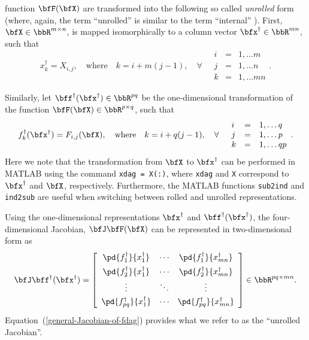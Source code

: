 \documentclass[10pt,pdftex]{article}
\begin{document}
function $\bfF(\bfX)$ are transformed into the following so called 
{\em unrolled} form (where, again, the term ``unrolled'' is similar to
the term ``internal'' \cite{Forth1}).  First, $\bfX\in\bbR^{m\times n}$, is mapped
isomorphically to a column vector $\bfx^\dag\in\bbR^{mn}$, such that
\begin{equation}\label{general-vector-xdag}
  x^\dag _k = X_{i,j}, \quad \text{where} \quad k = i+m(j-1),\quad \forall \quad \begin{array}{lll}
  i & = & 1,\dots m \\
  j & = & 1,\dots n \\
  k & = & 1,\dots mn
  \end{array}.
\end{equation}


Similarly, let
$\bff^\dag(\bfx^{\dag})\in\bbR^{pq}$ be the one-dimensional
transformation of the function $\bfF(\bfX)\in\bbR^{p\times q}$, such that 
\begin{equation}\label{general-function-fdag}
  f^\dag _k(\bfx^\dag) = F_{i,j}(\bfX), \quad \text{where} \quad k = i+q(j-1),\quad \forall \quad \begin{array}{lll}
  i & = & 1,\dots q \\
  j & = & 1,\dots p \\
  k & = & 1,\dots qp
  \end{array}.
\end{equation}
Here we note that the transformation from $\bfX$ to $\bfx^\dag$ can be performed in MATLAB using the command \texttt{xdag = X(:)}, where \texttt{xdag} and \texttt{X} correspond to $\bfx^\dag$ and $\bfX$, respectively. Furthermore, the MATLAB functions \texttt{sub2ind} and \texttt{ind2sub} are useful when switching between rolled and unrolled representations.


Using the one-dimensional representations $\bfx^{\dag}$ and
$\bff^{\dag}(\bfx^{\dag})$, the four-dimensional Jacobian,
$\bfJ\bfF(\bfX)$ can be represented in two-dimensional form as
\begin{equation}\label{general-Jacobian-of-fdag}
  \bfJ\bff^\dag(\bfx^\dag) =
  \left[
    \begin{array}{ccc}
      \pd{f^\dag_1}{x^\dag_1} & \cdots & \pd{f^\dag_1}{x^\dag_{mn}} \vspace{4pt} \\
      \pd{f^\dag_2}{x^\dag_1} & \cdots & \pd{f^\dag_2}{x^\dag_{mn}} \vspace{2pt} \\
      \vdots & \ddots & \vdots \vspace{2pt} \\
      \pd{f^\dag_{pq}}{x^\dag_1} & \cdots & \pd{f^\dag_{pq}}{x^\dag_{mn}} \vspace{2pt} \\
    \end{array}
  \right]\in\bbR^{pq\times mn}.
\end{equation}
Equation~(\ref{general-Jacobian-of-fdag}) provides what we refer to as the ``unrolled Jacobian''.


\renewcommand{\baselinestretch}{1}
\normalsize
\normalfont


\end{document}
